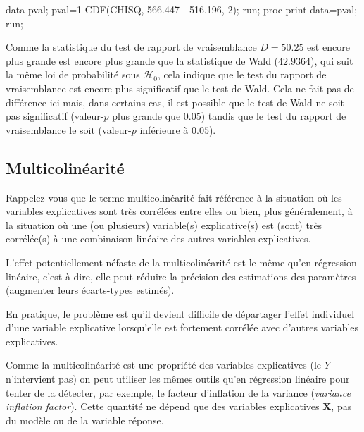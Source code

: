 \documentclass[
  11pt,
  letterpaper,
]{book}
\newenvironment{Shaded}{\begin{snugshade}}{\end{snugshade}}
\newcommand{\NormalTok}[1]{#1}
\theoremstyle{definition}
\theoremstyle{definition}
\theoremstyle{definition}
\theoremstyle{definition}
\theoremstyle{remark}
\begin{document}
\begin{Shaded}
\begin{Highlighting}[]
\NormalTok{data pval;}
\NormalTok{pval=1{-}CDF(\textquotesingle{}CHISQ\textquotesingle{}, 566.447 {-} 516.196, 2);}
\NormalTok{run;}
\NormalTok{proc print data=pval;}
\NormalTok{run;}
\end{Highlighting}
\end{Shaded}

Comme la statistique du test de rapport de vraisemblance \(D=50.25\) est encore plus grande est encore plus grande que la statistique de Wald (\(42.9364\)), qui suit la même loi de probabilité sous \(\mathcal{H}_0\), cela indique que le test du rapport de vraisemblance est encore plus significatif que le test de Wald. Cela ne fait pas de différence ici mais, dans certains cas, il est possible que le test de Wald ne soit pas significatif (valeur-\(p\) plus grande que \(0.05\)) tandis que le test du rapport de vraisemblance le soit (valeur-\(p\) inférieure à \(0.05\)).

\hypertarget{multicolinuxe9arituxe9}{%
\subsection{Multicolinéarité}\label{multicolinuxe9arituxe9}}

Rappelez-vous que le terme multicolinéarité fait référence à la situation où les variables explicatives sont très corrélées entre elles ou bien, plus généralement, à la situation où une (ou plusieurs) variable(s) explicative(s) est (sont) très corrélée(s) à une combinaison linéaire des autres variables explicatives.

L'effet potentiellement néfaste de la multicolinéarité est le même qu'en régression linéaire, c'est-à-dire, elle peut réduire la précision des estimations des paramètres (augmenter leurs écarts-types estimés).

En pratique, le problème est qu'il devient difficile de départager l'effet individuel d'une variable explicative lorsqu'elle est fortement corrélée avec d'autres variables explicatives.

Comme la multicolinéarité est une propriété des variables explicatives (le \(Y\) n'intervient pas) on peut utiliser les mêmes outils qu'en régression linéaire pour tenter de la détecter, par exemple, le facteur d'inflation de la variance (\emph{variance inflation factor}). Cette quantité ne dépend que des variables explicatives \(\boldsymbol{X}\), pas du modèle ou de la variable réponse.
\end{document}
